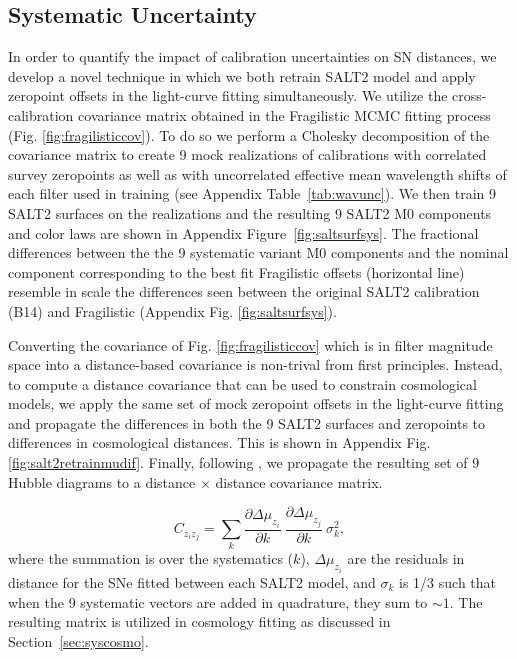 \documentclass[twocolumn]{aastex63}
\newcommand{\blue}{\color{black}}
\newcommand{\zindex}{z}
\begin{document}
\subsection{Systematic Uncertainty}
\label{sec:sys}
In order to quantify the impact of calibration uncertainties on SN distances, we develop a novel technique in which we both retrain SALT2 model and apply zeropoint offsets in the light-curve fitting simultaneously. We utilize the cross-calibration covariance matrix obtained in the Fragilistic MCMC fitting process (Fig. \ref{fig:fragilisticcov}). To do so we perform a Cholesky decomposition of the covariance matrix to create 9 mock realizations of calibrations with correlated survey zeropoints as well as with uncorrelated effective mean wavelength shifts of each filter used in training (see Appendix Table~\ref{tab:wavunc}). We then train 9 SALT2 surfaces on the realizations and the resulting 9 SALT2 M0 components and color laws are shown in Appendix Figure~\ref{fig:saltsurfsys}. The fractional differences between the the 9 systematic variant M0 components and the nominal component corresponding to the best fit Fragilistic offsets (horizontal line) resemble in scale the differences seen between the original SALT2 calibration (B14) and Fragilistic (Appendix Fig. \ref{fig:saltsurfsys}).  

Converting the covariance of Fig. \ref{fig:fragilisticcov} which is in filter magnitude space into a distance-based covariance is non-trival from first principles. Instead, to compute a distance covariance that can be used to constrain cosmological models, we apply the same set of mock zeropoint offsets in the light-curve fitting and propagate the differences in both the 9 SALT2 surfaces and zeropoints to differences in cosmological distances. This is shown in Appendix Fig. \ref{fig:salt2retrainmudif}. Finally, following \cite{Conley2010}, we propagate the resulting set of 9 Hubble diagrams to a distance $\times$ distance covariance matrix.

\begin{equation}
C_{{\zindex}_i{\zindex}_j} = \sum_{k} \frac{\partial \Delta\mu_{{\zindex}_i}}{\partial k} ~ \frac{\partial \Delta\mu_{{\zindex}_j}}{\partial k} ~ \sigma_k^2,
\label{eq:cov}
\end{equation}
where the summation is over the systematics ($k$), $\Delta\mu_{{\zindex}_i}$ {\blue are the residuals in distance for the SNe fitted between each SALT2 model}, and $\sigma_k$ is 1/3 such that when the 9 systematic vectors are added in quadrature, they sum to $\sim1$. The resulting matrix is utilized in cosmology fitting as discussed in Section~\ref{sec:syscosmo}.
\end{document}
